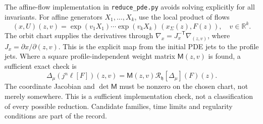 \documentclass[12pt,a4paper,oneside]{report}
\numberwithin{equation}{chapter}
\theoremstyle{definition}
\theoremstyle{remark}\newtheorem{remark}[theorem]{Remark}
\DeclareRobustCommand{\code}[1]{\nolinkurl{#1}}
\newif\ifreviewmarks
\DeclareRobustCommand{\review}[1]{{\ifreviewmarks\color{authorblue}\fi #1}}
\begin{document}
\review{The affine-flow implementation in \code{reduce_pde.py} avoids solving explicitly for all invariants. For affine generators $X_1,\ldots,X_k$, use the local product of flows}
\[
 \review{(x,U)(z,v)=
 \exp(v_1X_1)\cdots\exp(v_kX_k)\,(x_\Sigma(z),F(z)),\quad v\in\mathbb R^k.}
\]
\review{The orbit chart supplies the derivatives through $\nabla_x=J_x^{-\mathsf T}\nabla_{(z,v)}$, where $J_x=\partial x/\partial(z,v)$. This is the explicit map from the initial PDE jets to the profile jets. Where a square profile-independent weight matrix $\mathsf M(z,v)$ is found, a sufficient exact check is}
\begin{equation}\label{eq:weight-matrix}
 \review{\Delta_\mu(j^n\ell[F])(z,v)
   =\mathsf M(z,v)\mathcal R_{\mathfrak h}[\Delta_\mu](F)(z).}
\end{equation}
\review{The coordinate Jacobian and $\det\mathsf M$ must be nonzero on the chosen chart, not merely somewhere. This is a sufficient implementation check, not a classification of every possible reduction. Candidate families, time limits and regularity conditions are part of the record.}
\end{document}
